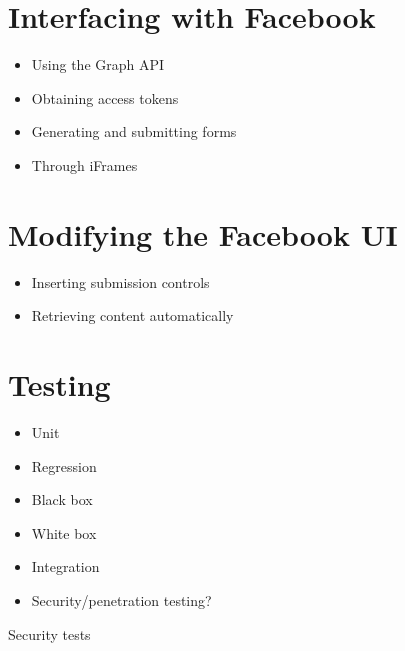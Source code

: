 
\section{Interfacing with Facebook}
    \begin{itemize}
        \item Using the Graph API
        \item Obtaining access tokens
        \item Generating and submitting forms
        \item Through iFrames
    \end{itemize}

\section{Modifying the Facebook UI}
    \begin{itemize}
        \item Inserting submission controls
        \item Retrieving content automatically
    \end{itemize}

\section{Testing}
    \begin{itemize}
        \item Unit
        \item Regression
        \item Black box
        \item White box
        \item Integration
        \item Security/penetration testing?
    \end{itemize}
    
    Security tests
    
